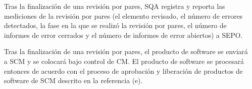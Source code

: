 Tras la finalización de una revisión por pares, SQA registra y reporta las mediciones de la revisión por pares (el elemento revisado, el número de errores detectados, la fase en la que se realizó la revisión por pares, el número de informes de error cerrados y el número de informes de error abiertos) a SEPO.

Tras la finalización de una revisión por pares, el producto de software se enviará a SCM y se colocará bajo control de CM. El producto de software se procesará entonces de acuerdo con el proceso de aprobación y liberación de productos de software de SCM descrito en la referencia (e).
